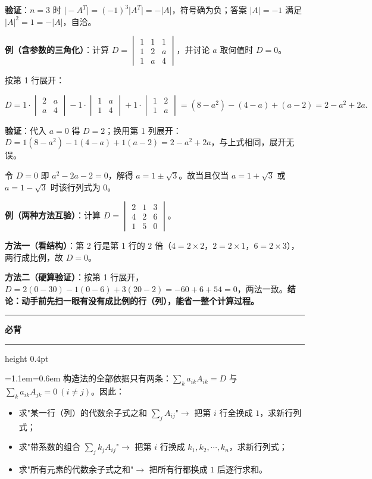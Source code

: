 \documentclass[11pt,openany,UTF8]{ctexbook}
\newcommand{\callouthead}[2]{%
  \par\addvspace{7pt}\noindent
  {\color{#1}\rule[-0.15em]{3pt}{1.05em}}\hspace{0.5em}%
  {\bfseries\color{#1}#2}\par\nobreak\vspace{-0.35em}%
  {\color{rulesep}\hrule height 0.4pt}\nobreak\vspace{0.45em}%
  \begingroup\small\setlength{\parindent}{0pt}%
  \leftskip=1.1em\rightskip=0.6em\noindent\ignorespaces}
\newcommand{\calloutend}{\par\endgroup\addvspace{7pt}}
\newenvironment{callkey}[1]{\callouthead{keybar}{#1}}{\calloutend}
\begin{document}
\textbf{验证}：$n=3$ 时 $\vert -A^T\vert=(-1)^3\vert A^T\vert=-\vert A\vert$，符号确为负；答案 $\vert A\vert=-1$ 满足 $\vert A\vert^2=1=-\vert A\vert$，自洽。

\textbf{例（含参数的三角化）}：计算 $D=\begin{vmatrix}1&1&1\\1&2&a\\1&a&4\end{vmatrix}$，并讨论 $a$ 取何值时 $D=0$。

按第 1 行展开：

\[D=1\cdot\begin{vmatrix}2&a\\a&4\end{vmatrix}-1\cdot\begin{vmatrix}1&a\\1&4\end{vmatrix}+1\cdot\begin{vmatrix}1&2\\1&a\end{vmatrix}=(8-a^2)-(4-a)+(a-2)=2-a^2+2a .\]

\textbf{验证}：代入 $a=0$ 得 $D=2$；换用第 1 列展开：$D=1(8-a^2)-1(4-a)+1(a-2)=2-a^2+2a$，与上式相同，展开无误。

令 $D=0$ 即 $a^2-2a-2=0$，解得 $a=1\pm\sqrt3$。故当且仅当 $a=1+\sqrt3$ 或 $a=1-\sqrt3$ 时该行列式为 $0$。

\textbf{例（两种方法互验）}：计算 $D=\begin{vmatrix}2&1&3\\4&2&6\\1&5&0\end{vmatrix}$。

\textbf{方法一（看结构）}：第 2 行是第 1 行的 $2$ 倍（$4=2\times2$，$2=2\times1$，$6=2\times3$），两行成比例，故 $D=0$。

\textbf{方法二（硬算验证）}：按第 1 行展开，$D=2(0-30)-1(0-6)+3(20-2)=-60+6+54=0$，两法一致。\textbf{结论：动手前先扫一眼有没有成比例的行（列），能省一整个计算过程。}

\begin{callkey}{必背}
构造法的全部依据只有两条：$\sum_{k}a_{ik}A_{ik}=D$ 与 $\sum_{k}a_{ik}A_{jk}=0\ (i\ne j)$。因此：

\begin{itemize}
\item 求"某一行（列）的代数余子式之和 $\sum_j A_{ij}$"$\to$ 把第 $i$ 行全换成 $1$，求新行列式；
\item 求"带系数的组合 $\sum_j k_jA_{ij}$"$\to$ 把第 $i$ 行换成 $k_1,k_2,\cdots,k_n$，求新行列式；
\item 求"所有元素的代数余子式之和"$\to$ 把所有行都换成 $1$ 后逐行求和。
\end{itemize}
\end{callkey}
\end{document}
